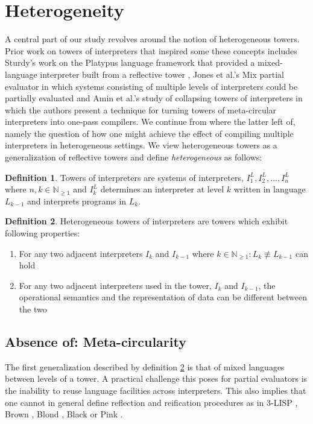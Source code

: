 \documentclass[a4paper,12pt,twoside,openright]{report}
\theoremstyle{definition}
\newtheorem{definition}{Definition}[section]
\begin{document}
\section{Heterogeneity}\label{sec:heterogeneity}
A central part of our study revolves around the notion of heterogeneous towers. Prior work on towers of interpreters that inspired some these concepts includes Sturdy's work on the Platypus language framework that provided a mixed-language interpreter built from a reflective tower \cite{sturdy1993lisp}, Jones et al.'s Mix partial evaluator \cite{jones1989mix} in which systems consisting of multiple levels of interpreters could be partially evaluated and Amin et al.'s study of collapsing towers of interpreters in which the authors present a technique for turning towers of meta-circular interpreters into one-pass compilers. We continue from where the latter left of, namely the question of how one might achieve the effect of compiling multiple interpreters in heterogeneous settings. We view heterogeneous towers as a generalization of reflective towers and define \textit{heterogeneous} as follows:
\newline
\theoremstyle{definition}
\begin{definition}
	Towers of interpreters are systems of interpreters, $I^L_1, I^L_2, ..., I^L_n$ where $n,k \in \mathbb N_{\ge 1}$ and $I^L_k$ determines an interpreter at level $k$ written in language $L_{k-1}$ and interprets programs in $L_k$.
\end{definition}

\begin{definition}
    \label{def:het}
	Heterogeneous towers of interpreters are towers which exhibit following properties:
	\begin{enumerate}
		\item For any two adjacent interpreters $I_k$ and $I_{k-1}$ where $k \in \mathbb N_{\ge 1}: L_k \not\equiv L_{k-1}$ can hold
		\item For any two adjacent interpreters used in the tower, $I_{k}$ and $I_{k-1}$, the operational semantics and the representation of data can be different between the two
	\end{enumerate}
\end{definition}

\subsection{Absence of: Meta-circularity}
The first generalization described by definition \ref{def:het} is that of mixed languages between levels of a tower. A practical challenge this poses for partial evaluators is the inability to reuse language facilities across interpreters. This also implies that one cannot in general define reflection and reification procedures as in 3-LISP \cite{smith1984reflection}, Brown \cite{wand1988mystery}, Blond \cite{danvy1988intensions}, Black \cite{asai1996duplication} or Pink \cite{amin2017collapsing}.
\end{document}

